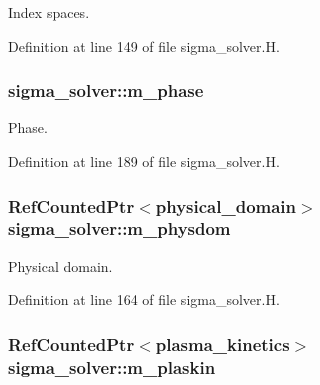 Index spaces. 



Definition at line 149 of file sigma\+\_\+solver.\+H.

\subsubsection[{\texorpdfstring{m\+\_\+phase}{m_phase}}]{ sigma\+\_\+solver\+::m\+\_\+phase\hspace{0.3cm}{\ttfamily [protected]}}\hypertarget{classsigma__solver_aafabe1cc6672de0c765671f3ce43a407}{}\label{classsigma__solver_aafabe1cc6672de0c765671f3ce43a407}


Phase. 



Definition at line 189 of file sigma\+\_\+solver.\+H.

\subsubsection[{\texorpdfstring{m\+\_\+physdom}{m_physdom}}]{\setlength{\rightskip}{0pt plus 5cm}Ref\+Counted\+Ptr$<${\bf physical\+\_\+domain}$>$ sigma\+\_\+solver\+::m\+\_\+physdom\hspace{0.3cm}{\ttfamily [protected]}}\hypertarget{classsigma__solver_adaa5b192aad33f3b4b8d561a62d04d94}{}\label{classsigma__solver_adaa5b192aad33f3b4b8d561a62d04d94}


Physical domain. 



Definition at line 164 of file sigma\+\_\+solver.\+H.

\subsubsection[{\texorpdfstring{m\+\_\+plaskin}{m_plaskin}}]{\setlength{\rightskip}{0pt plus 5cm}Ref\+Counted\+Ptr$<${\bf plasma\+\_\+kinetics}$>$ sigma\+\_\+solver\+::m\+\_\+plaskin\hspace{0.3cm}{\ttfamily [protected]}}\hypertarget{classsigma__solver_a6f7a5654ee018eaa52b544ffd0710688}{}\label{classsigma__solver_a6f7a5654ee018eaa52b544ffd0710688}


